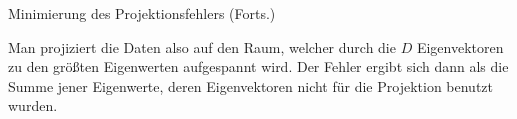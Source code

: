 \begin{frame}{Minimierung des Projektionsfehlers (Forts.)}{}
	\begin{boxGray}
		Man projiziert die Daten also auf den Raum, welcher durch die $D$ Eigenvektoren zu den größten Eigenwerten aufgespannt wird.
		Der Fehler ergibt sich dann als die Summe jener Eigenwerte, deren Eigenvektoren nicht für die Projektion benutzt wurden.
	\end{boxGray}
\end{frame}
